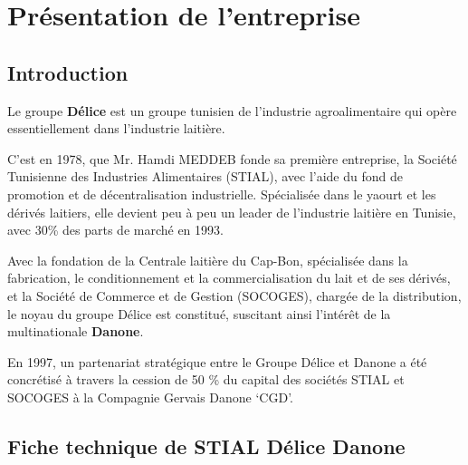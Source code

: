 \setcounter{mtc}{4} %
\chapter{Présentation de l’entreprise}
\minitoc  %

\graphicspath{{Chapter1/figures/}}
\pagestyle{fancy}
\fancyhf{}
\fancyhead[R]{\bfseries\rightmark}
\fancyfoot[R]{\thepage}
\renewcommand{\headrulewidth}{0.5pt}
\renewcommand{\footrulewidth}{0pt}
\renewcommand{\chaptermark}[1]{\markboth{\MakeUppercase{\chaptername~\thechapter. #1 }}{}}
\renewcommand{\sectionmark}[1]{\markright{\thechapter.\thesection~ #1}}

\begin{spacing}{1.2}

\section*{Introduction}
Le groupe \textbf{Délice} est un groupe tunisien de l’industrie agroalimentaire qui opère essentiellement dans l’industrie laitière.\newline


C’est en 1978, que Mr. Hamdi MEDDEB fonde sa première entreprise, la Société Tunisienne des Industries Alimentaires (STIAL), avec l’aide du fond de promotion et de décentralisation industrielle. Spécialisée dans le yaourt et les dérivés laitiers, elle devient peu à peu un leader de l’industrie laitière en Tunisie, avec 30\% des parts de marché en 1993.\newline


Avec la fondation de la Centrale laitière du Cap-Bon, spécialisée dans la fabrication, le conditionnement et la commercialisation du lait et de ses dérivés, et la Société de Commerce et de Gestion (SOCOGES), chargée de la distribution, le noyau du groupe Délice est constitué, suscitant ainsi l’intérêt de la multinationale \textbf{Danone}.\newline


En 1997, un partenariat stratégique entre le Groupe Délice et Danone a été concrétisé à travers la cession de 50 \% du capital des sociétés STIAL et SOCOGES à la Compagnie Gervais Danone `CGD'.\newline

\section{Fiche technique de STIAL Délice Danone}


\end{spacing}
